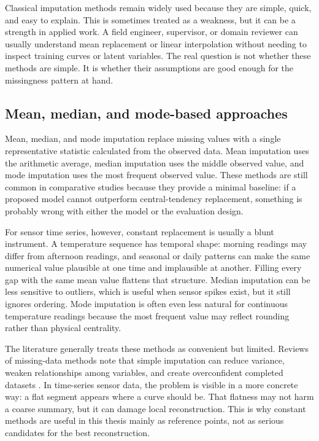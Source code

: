Classical imputation methods remain widely used because they are simple, quick, and easy to explain. This is sometimes treated as a weakness, but it can be a strength in applied work. A field engineer, supervisor, or domain reviewer can usually understand mean replacement or linear interpolation without needing to inspect training curves or latent variables. The real question is not whether these methods are simple. It is whether their assumptions are good enough for the missingness pattern at hand.

\subsection{Mean, median, and mode-based approaches}

Mean, median, and mode imputation replace missing values with a single representative statistic calculated from the observed data. Mean imputation uses the arithmetic average, median imputation uses the middle observed value, and mode imputation uses the most frequent observed value. These methods are still common in comparative studies because they provide a minimal baseline: if a proposed model cannot outperform central-tendency replacement, something is probably wrong with either the model or the evaluation design.

For sensor time series, however, constant replacement is usually a blunt instrument. A temperature sequence has temporal shape: morning readings may differ from afternoon readings, and seasonal or daily patterns can make the same numerical value plausible at one time and implausible at another. Filling every gap with the same mean value flattens that structure. Median imputation can be less sensitive to outliers, which is useful when sensor spikes exist, but it still ignores ordering. Mode imputation is often even less natural for continuous temperature readings because the most frequent value may reflect rounding rather than physical centrality.

The literature generally treats these methods as convenient but limited. Reviews of missing-data methods note that simple imputation can reduce variance, weaken relationships among variables, and create overconfident completed datasets \cite{Little2019,Alwateer2024MissingDI}. In time-series sensor data, the problem is visible in a more concrete way: a flat segment appears where a curve should be. That flatness may not harm a coarse summary, but it can damage local reconstruction. This is why constant methods are useful in this thesis mainly as reference points, not as serious candidates for the best reconstruction.

